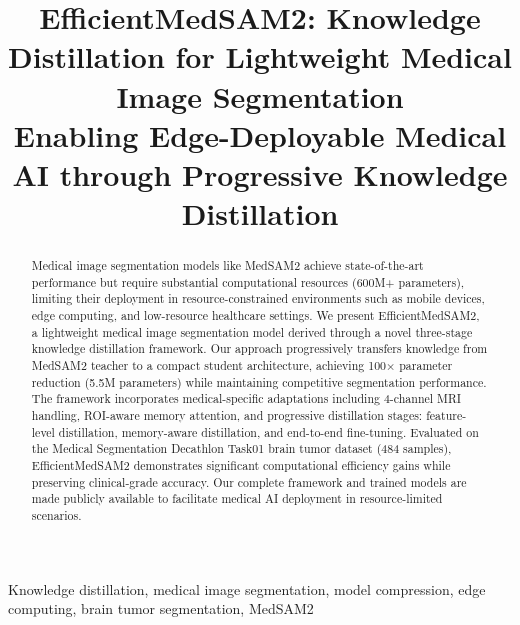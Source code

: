 \documentclass[conference]{IEEEtran}
\begin{document}
\title{EfficientMedSAM2: Knowledge Distillation for Lightweight Medical Image Segmentation\\
{\footnotesize \textnormal{Enabling Edge-Deployable Medical AI through Progressive Knowledge Distillation}}}

\author{
\and
{}
}

\maketitle

\begin{abstract}
Medical image segmentation models like MedSAM2 achieve state-of-the-art performance but require substantial computational resources (600M+ parameters), limiting their deployment in resource-constrained environments such as mobile devices, edge computing, and low-resource healthcare settings. We present EfficientMedSAM2, a lightweight medical image segmentation model derived through a novel three-stage knowledge distillation framework. Our approach progressively transfers knowledge from MedSAM2 teacher to a compact student architecture, achieving 100× parameter reduction (5.5M parameters) while maintaining competitive segmentation performance. The framework incorporates medical-specific adaptations including 4-channel MRI handling, ROI-aware memory attention, and progressive distillation stages: feature-level distillation, memory-aware distillation, and end-to-end fine-tuning. Evaluated on the Medical Segmentation Decathlon Task01 brain tumor dataset (484 samples), EfficientMedSAM2 demonstrates significant computational efficiency gains while preserving clinical-grade accuracy. Our complete framework and trained models are made publicly available to facilitate medical AI deployment in resource-limited scenarios.
\end{abstract}

\begin{IEEEkeywords}
Knowledge distillation, medical image segmentation, model compression, edge computing, brain tumor segmentation, MedSAM2
\end{IEEEkeywords}
\end{document}
